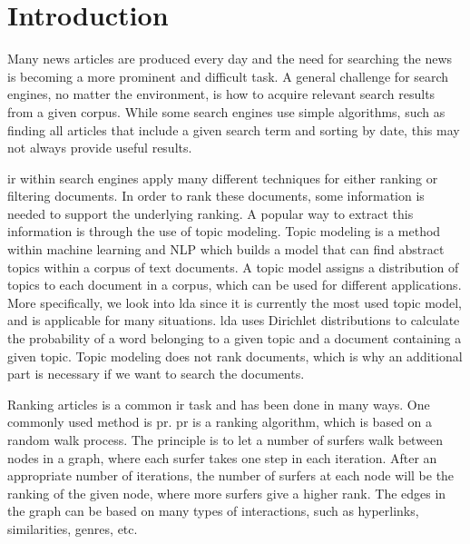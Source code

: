 \section{Introduction}\label{sec:intro}


Many news articles are produced every day and the need for searching the news is becoming a more prominent and difficult task.
A general challenge for search engines, no matter the environment, is how to acquire relevant search results from a given corpus. 
While some search engines use simple algorithms, such as finding all articles that include a given search term and sorting by date, this may not always provide useful results.

\gls{ir} within search engines apply many different techniques for either ranking or filtering documents\cite{google_pagerank2006}.
In order to rank these documents, some information is needed to support the underlying ranking.
A popular way to extract this information is through the use of topic modeling.
Topic modeling is a method within machine learning and \gls{NLP} which builds a model that can find abstract topics within a corpus of text documents.
A topic model assigns a distribution of topics to each document in a corpus, which can be used for different applications.
More specifically, we look into \gls{lda} since it is currently the most used topic model, and is applicable for many situations\cite{lda}.
\gls{lda} uses Dirichlet distributions to calculate the probability of a word belonging to a given topic and a document containing a given topic.
Topic modeling does not rank documents, which is why an additional part is necessary if we want to search the documents.

Ranking articles is a common \gls{ir} task and has been done in many ways.
One commonly used method is \gls{pr}\cite{google_pagerank2006}.
\gls{pr}\cite{pagerank_1999} is a ranking algorithm, which is based on a random walk process.
The principle is to let a number of surfers walk between nodes in a graph, where each surfer takes one step in each iteration.
After an appropriate number of iterations, the number of surfers at each node will be the ranking of the given node, where more surfers give a higher rank.
The edges in the graph can be based on many types of interactions, such as hyperlinks, similarities, genres, etc.

